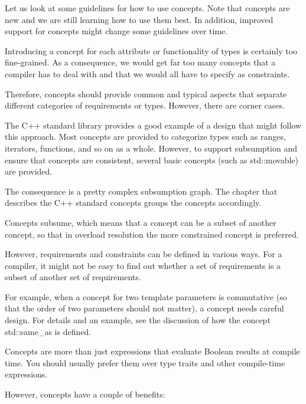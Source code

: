 
Let us look at some guidelines for how to use concepts. Note that concepts are new and we are still learning how to use them best. In addition, improved support for concepts might change some guidelines over time.



Introducing a concept for each attribute or functionality of types is certainly too fine-grained. As a consequence, we would get far too many concepts that a compiler has to deal with and that we would all have to specify as constraints.

Therefore, concepts should provide common and typical aspects that separate different categories of requirements or types. However, there are corner cases.

The C++ standard library provides a good example of a design that might follow this approach. Most concepts are provided to categorize types such as ranges, iterators, functions, and so on as a whole. However, to support subsumption and ensure that concepts are consistent, several basic concepts (such as std::movable) are provided.

The consequence is a pretty complex subsumption graph. The chapter that describes the C++ standard concepts groups the concepts accordingly.


Concepts subsume, which means that a concept can be a subset of another concept, so that in overload resolution the more constrained concept is preferred.

However, requirements and constraints can be defined in various ways. For a compiler, it might not be easy to find out whether a set of requirements is a subset of another set of requirements.

For example, when a concept for two template parameters is commutative (so that the order of two parameters should not matter), a concept needs careful design. For details and an example, see the discussion of how the concept std::same\_as is defined.


Concepts are more than just expressions that evaluate Boolean results at compile time. You should usually prefer them over type traits and other compile-time expressions.

However, concepts have a couple of benefits:

